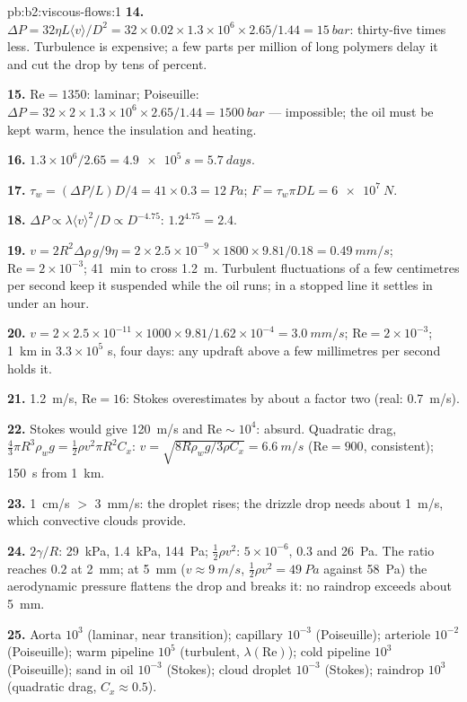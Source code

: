 \begin{solution}{pb:b2:viscous-flows:1}
\textbf{14.} $\Delta P = 32\eta L\langle v\rangle/D^2 = 32 \times 0.02 \times 1.3 \times 10^6
\times 2.65/1.44 = \qty{15}{bar}$: thirty-five times less. Turbulence is
expensive; a few parts per million of long polymers delay it and cut
the drop by tens of percent.

\textbf{15.} $\mathrm{Re} = 1350$: laminar; Poiseuille: $\Delta P = 32 \times 2 \times 1.3 \times
10^6 \times 2.65/1.44 = \qty{1500}{bar}$ --- impossible; the oil must be kept
warm, hence the insulation and heating.

\textbf{16.} $1.3 \times 10^6/2.65 = \qty{4.9e5}{s} = \qty{5.7}{days}$.

\textbf{17.} $\tau_w = (\Delta P/L)D/4 = 41 \times 0.3 = \qty{12}{Pa}$; $F = \tau_w\pi DL =
\qty{6e7}{N}$.

\textbf{18.} $\Delta P \propto \lambda\langle v\rangle^2/D \propto D^{-4.75}$: $1.2^{4.75} = 2.4$.

\textbf{19.} $v = 2R^2\Delta\rho\,g/9\eta = 2 \times 2.5 \times 10^{-9} \times 1800 \times 9.81/
0.18 = \qty{0.49}{mm/s}$; $\mathrm{Re} = 2 \times 10^{-3}$; \qty{41}{min} to cross
\qty{1.2}{m}. Turbulent fluctuations of a few centimetres per second
keep it suspended while the oil runs; in a stopped line it settles in
under an hour.

\textbf{20.} $v = 2 \times 2.5 \times 10^{-11} \times 1000 \times 9.81/1.62 \times 10^{-4} =
\qty{3.0}{mm/s}$; $\mathrm{Re} = 2 \times 10^{-3}$; \qty{1}{km} in $3.3 \times 10^5$ s, four
days: any updraft above a few millimetres per second holds it.

\textbf{21.} \qty{1.2}{m/s}, $\mathrm{Re} = 16$: Stokes overestimates by about a
factor two (real: \qty{0.7}{m/s}).

\textbf{22.} Stokes would give \qty{120}{m/s} and $\mathrm{Re} \sim 10^4$: absurd.
Quadratic drag, $\tfrac43\pi R^3\rho_wg = \tfrac12\rho v^2\pi R^2C_x$: $v = \sqrt{8R
\rho_wg/3\rho C_x} = \qty{6.6}{m/s}$ ($\mathrm{Re} = 900$, consistent); \qty{150}{s} from
\qty{1}{km}.

\textbf{23.} \qty{1}{cm/s} $>$ \qty{3}{mm/s}: the droplet rises; the drizzle drop
needs about \qty{1}{m/s}, which convective clouds provide.

\textbf{24.} $2\gamma/R$: \qty{29}{kPa}, \qty{1.4}{kPa}, \qty{144}{Pa};  $\tfrac12\rho v^2$: $5 \times 10^{-6}$, $0.3$ and \qty{26}{Pa}. The ratio
reaches $0.2$ at \qty{2}{mm}; at \qty{5}{mm} ($v \approx \qty{9}{m/s}$, $\tfrac12\rho v^2 =
\qty{49}{Pa}$ against \qty{58}{Pa}) the aerodynamic pressure flattens the
drop and breaks it: no raindrop exceeds about \qty{5}{mm}.

\textbf{25.} Aorta $10^3$ (laminar, near transition); capillary $10^{-3}$
(Poiseuille); arteriole $10^{-2}$ (Poiseuille); warm pipeline $10^5$
(turbulent, $\lambda(\mathrm{Re})$); cold pipeline $10^3$ (Poiseuille); sand in
oil $10^{-3}$ (Stokes); cloud droplet $10^{-3}$ (Stokes); raindrop $10^3$
(quadratic drag, $C_x \approx 0.5$).
\end{solution}
